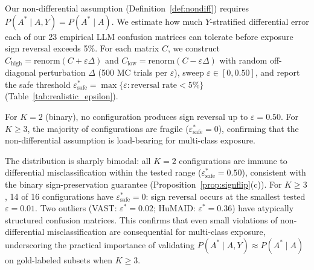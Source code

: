 Our non-differential assumption (Definition~\ref{def:nondiff}) requires $P(A^*{\mid}A,Y) = P(A^*{\mid}A)$. We estimate how much $Y$-stratified differential error each of our 23 empirical LLM confusion matrices can tolerate before exposure sign reversal exceeds 5\%. For each matrix $C$, we construct $C_{\text{high}} = \text{renorm}(C + \varepsilon\Delta)$ and $C_{\text{low}} = \text{renorm}(C - \varepsilon\Delta)$ with random off-diagonal perturbation $\Delta$ (500 MC trials per $\varepsilon$), sweep $\varepsilon \in [0, 0.50]$, and report the safe threshold $\varepsilon^*_{\text{safe}} = \max\{\varepsilon : \text{reversal rate} < 5\%\}$ (Table~\ref{tab:realistic_epsilon}).

For $K{=}2$ (binary), no configuration produces sign reversal up to $\varepsilon{=}0.50$. For $K{\geq}3$, the majority of configurations are fragile ($\varepsilon^*_{\text{safe}}{=}0$), confirming that the non-differential assumption is load-bearing for multi-class exposure.

\begin{table}[H]
\centering
\caption{Safe differential misclassification thresholds $\varepsilon^*_{\text{safe}}$ by dataset/$K$.}
\label{tab:realistic_epsilon}
\end{table}

The distribution is sharply bimodal: all $K{=}2$ configurations are immune to differential misclassification within the tested range ($\varepsilon^*_{\text{safe}}{=}0.50$), consistent with the binary sign-preservation guarantee (Proposition~\ref{prop:signflip}(c)). For $K{\geq}3$, 14 of 16 configurations have $\varepsilon^*_{\text{safe}}{=}0$: sign reversal occurs at the smallest tested $\varepsilon{=}0.01$. Two outliers (VAST: $\varepsilon^*{=}0.02$; HuMAID: $\varepsilon^*{=}0.36$) have atypically structured confusion matrices. This confirms that even small violations of non-differential misclassification are consequential for multi-class exposure, underscoring the practical importance of validating $P(A^*{\mid}A,Y) \approx P(A^*{\mid}A)$ on gold-labeled subsets when $K \geq 3$.

